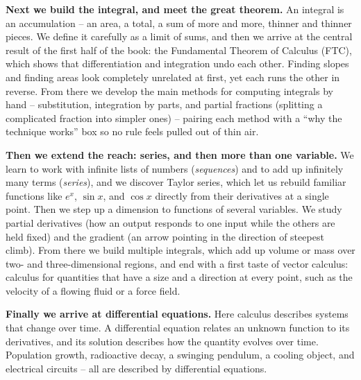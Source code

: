\textbf{Next we build the integral, and meet the great theorem.} An integral is an accumulation -- an
area, a total, a sum of more and more, thinner and thinner pieces. We define it carefully as a limit of
sums, and then we arrive at the central result of the first half of the book: the Fundamental Theorem of
Calculus (FTC), which shows that differentiation and integration undo each other. Finding slopes and finding
areas look completely unrelated at first, yet each runs the other in reverse. From there we develop the main methods for computing integrals by hand -- substitution, integration by parts, and
partial fractions (splitting a complicated fraction into simpler ones) -- pairing each method with a ``why the technique works'' box so no rule feels pulled out of thin air.

\textbf{Then we extend the reach: series, and then more than one variable.} We learn to work with
infinite lists of numbers (\emph{sequences}) and to add up infinitely many terms (\emph{series}), and
we discover Taylor series, which let us rebuild
familiar functions like $e^x$, $\sin x$, and $\cos x$ directly from their derivatives at a
single point. Then we step up a dimension to functions of several variables. We study partial derivatives (how an output responds to one input while the others are held fixed) and the gradient (an arrow pointing in the direction of steepest climb). From there we build multiple integrals, which add up volume or mass over two- and three-dimensional regions, and end with a first taste of vector calculus: calculus for quantities that have a size and a direction at every point, such as the velocity of a flowing fluid or a force field.

\textbf{Finally we arrive at differential equations.} Here calculus describes systems that change
over time. A differential equation relates an unknown function to its derivatives, and
its solution describes how the quantity evolves over time. Population growth,
radioactive decay, a swinging pendulum, a cooling object, and electrical circuits -- all are described
by differential equations.

